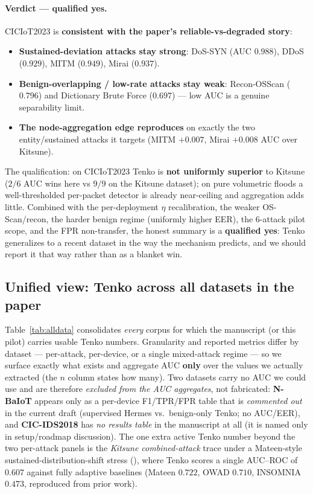 \documentclass[11pt]{article}
\begin{document}
\paragraph{Verdict --- qualified yes.} CICIoT2023 is \textbf{consistent with the paper's
reliable-vs-degraded story}:
\begin{itemize}
  \item \textbf{Sustained-deviation attacks stay strong}: DoS-SYN (AUC $0.988$), DDoS ($0.929$),
        MITM ($0.949$), Mirai ($0.937$).
  \item \textbf{Benign-overlapping / low-rate attacks stay weak}: Recon-OSScan ($0.796$) and
        Dictionary Brute Force ($0.697$) --- low AUC is a genuine separability limit.
  \item \textbf{The node-aggregation edge reproduces} on exactly the two entity/sustained attacks it
        targets (MITM $+0.007$, Mirai $+0.008$ AUC over Kitsune).
\end{itemize}
The qualification: on CICIoT2023 Tenko is \textbf{not uniformly superior} to Kitsune ($2/6$ AUC wins
here vs $9/9$ on the Kitsune dataset); on pure volumetric floods a well-thresholded per-packet
detector is already near-ceiling and aggregation adds little. Combined with the per-deployment
$\eta$ recalibration, the weaker OS-Scan/recon, the harder benign regime (uniformly higher EER), the
$6$-attack pilot scope, and the FPR non-transfer, the honest summary is a \textbf{qualified yes}:
Tenko generalizes to a recent dataset in the way the mechanism predicts, and we should report it
that way rather than as a blanket win.

\subsection{Unified view: Tenko across all datasets in the paper}
\label{sec:alldata}

Table~\ref{tab:alldata} consolidates \emph{every} corpus for which the manuscript (or this pilot)
carries usable Tenko numbers. Granularity and reported metrics differ by dataset --- per-attack,
per-device, or a single mixed-attack regime --- so we surface exactly what exists and aggregate AUC
\textbf{only} over the values we actually extracted (the $n$ column states how many). Two datasets
carry no AUC we could use and are therefore \emph{excluded from the AUC aggregates}, not fabricated:
\textbf{N-BaIoT} appears only as a per-device F1/TPR/FPR table that is \emph{commented out} in the
current draft (supervised Hermes vs.\ benign-only Tenko; no AUC/EER), and \textbf{CIC-IDS2018} has
\emph{no results table} in the manuscript at all (it is named only in setup/roadmap discussion). The
one extra active Tenko number beyond the two per-attack panels is the \emph{Kitsune combined-attack}
trace under a Mateen-style sustained-distribution-shift stress (),
where Tenko scores a single AUC--ROC of $0.607$ against fully adaptive baselines (Mateen $0.722$,
OWAD $0.710$, INSOMNIA $0.473$, reproduced from prior work).
\end{document}
